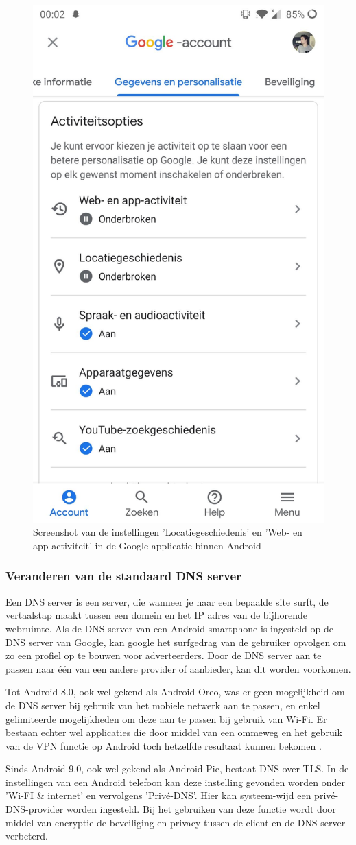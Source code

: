 \begin{figure}
    \centering
    \includegraphics[width=0.4\linewidth]{img/activiteitsopties-mobiel.jpg}
    \caption{Screenshot van de instellingen 'Locatiegeschiedenis' en 'Web- en app-activiteit' in de Google applicatie binnen Android}
    \label{fig:activityoptions_mobile}
\end{figure}


\subsubsection{Veranderen van de standaard DNS server}
Een DNS server is een server, die wanneer je naar een bepaalde site surft, de vertaalstap maakt tussen een domein en het IP adres van de bijhorende webruimte. Als de DNS server van een Android smartphone is ingesteld op de DNS server van Google, kan google het surfgedrag van de gebruiker opvolgen om zo een profiel op te bouwen voor adverteerders. Door de DNS server aan te passen naar één van een andere provider of aanbieder, kan dit worden voorkomen.

Tot Android 8.0, ook wel gekend als Android Oreo, was er geen mogelijkheid om de DNS server bij gebruik van het mobiele netwerk aan te passen, en enkel gelimiteerde mogelijkheden om deze aan te passen bij gebruik van Wi-Fi. Er bestaan echter wel applicaties die door middel van een ommeweg en het gebruik van de VPN functie op Android toch hetzelfde resultaat kunnen bekomen \autocite{knight_degoogle}. 

Sinds Android 9.0, ook wel gekend als Android Pie, bestaat DNS-over-TLS. In de instellingen van een Android telefoon kan deze instelling gevonden worden onder 'Wi-FI \& internet' en vervolgens 'Privé-DNS'. Hier kan systeem-wijd een privé-DNS-provider worden ingesteld. Bij het gebruiken van deze functie wordt door middel van encryptie de beveiliging en privacy tussen de client en de DNS-server verbeterd. \autocite{google_dns-tls}

